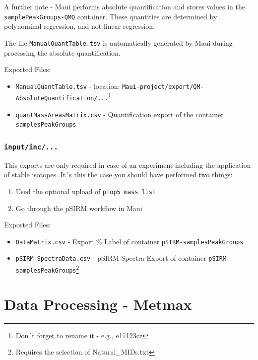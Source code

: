 \documentclass[]{book}
\providecommand{\tightlist}{%
  \setlength{\itemsep}{0pt}\setlength{\parskip}{0pt}}
\let\rmarkdownfootnote\footnote%
\def\footnote{\protect\rmarkdownfootnote}
\theoremstyle{definition}
\theoremstyle{definition}
\theoremstyle{definition}
\theoremstyle{remark}
\begin{document}
A further note - Maui performs absolute quantification and stores values
in the \texttt{samplePeakGroups-QMQ} container. These quantities are
determined by polynominal regression, and not linear regression.

The file \texttt{ManualQuantTable.tsv} is automatically generated by
Maui during processing the absolute quantification.

Exported Files:

\begin{itemize}
\tightlist
\item
  \texttt{ManualQuantTable.tsv} - location:
  \texttt{Maui-project/export/QM-AbsoluteQuantification/...}\footnote{Don´t
    forget to rename it - e.g., e17123cz}
\item
  \texttt{quantMassAreasMatrix.csv} - Quantification export of the
  container \texttt{samplesPeakGroups}
\end{itemize}

\subsection{\texorpdfstring{\texttt{input/inc/...}}{input/inc/...}}\label{inputinc...}

This exports are only required in case of an experiment including the
application of stable isotopes. It´s this the case you should have
performed two things:

\begin{enumerate}
\def\labelenumi{\arabic{enumi}.}
\tightlist
\item
  Used the optional upload of \texttt{pTop5\ mass\ list}
\item
  Go through the pSIRM workflow in Maui
\end{enumerate}

Exported Files:

\begin{itemize}
\tightlist
\item
  \texttt{DataMatrix.csv} - Export \% Label of container
  \texttt{pSIRM-samplesPeakGroups}
\item
  \texttt{pSIRM\_SpectraData.csv} - pSIRM Spectra Export of container
  \texttt{pSIRM-samplesPeakGroups}\footnote{Requires the selection of
    Natural\_MIDs.txt}
\end{itemize}

\chapter{Data Processing - Metmax}\label{proc:metmax}
\end{document}
